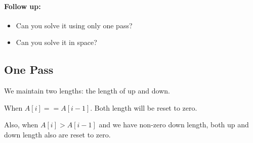 \paragraph{Follow up:}

\begin{itemize}
\item Can you solve it using only one pass?
\item Can you solve it in  space?
\end{itemize}

\subsection{One Pass}

We maintain two lengths: the length of up and down. 

When $A[i]==A[i-1]$. Both length will be reset to zero.

Also, when $A[i] > A[i-1]$ and we have non-zero down length, both up and down length also are reset to zero.

\setcounter{lstlisting}{0}


